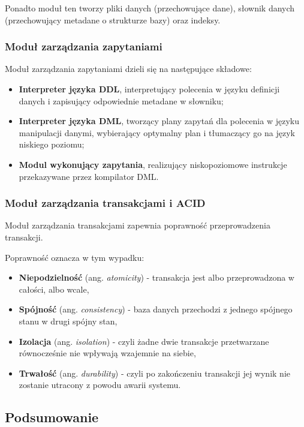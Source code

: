 Ponadto moduł ten tworzy pliki danych (przechowujące dane), słownik danych (przechowujący metadane o strukturze bazy) oraz indeksy.

\subsubsection{Moduł zarządzania zapytaniami}

Moduł zarządzania zapytaniami dzieli się na następujące składowe:
\begin{itemize}
    \item \textbf{Interpreter języka DDL}, interpretujący polecenia w języku definicji danych i zapisujący odpowiednie metadane w słowniku;
    \item \textbf{Interpreter języka DML}, tworzący plany zapytań dla polecenia w języku manipulacji danymi, wybierający optymalny plan i tłumaczący go na język niskiego poziomu;
    \item \textbf{Modul wykonujący zapytania}, realizujący niskopoziomowe instrukcje przekazywane przez kompilator DML.
\end{itemize}

\subsubsection{Moduł zarządzania transakcjami i ACID}

Moduł zarządzania transakcjami zapewnia poprawność przeprowadzenia transakcji.

Poprawność oznacza w tym wypadku:
\begin{itemize}
    \item \textbf{Niepodzielność} (ang. \textit{atomicity}) - transakcja jest albo przeprowadzona w całości, albo wcale,
    \item \textbf{Spójność} (ang. \textit{consistency}) - baza danych przechodzi z jednego spójnego stanu w drugi spójny stan,
    \item \textbf{Izolacja} (ang. \textit{isolation}) - czyli żadne dwie transakcje przetwarzane równocześnie nie wpływają wzajemnie na siebie,
    \item \textbf{Trwałość} (ang. \textit{durability}) - czyli po zakończeniu transakcji jej wynik nie zostanie utracony z powodu awarii systemu.
\end{itemize}


\subsection{Podsumowanie}

